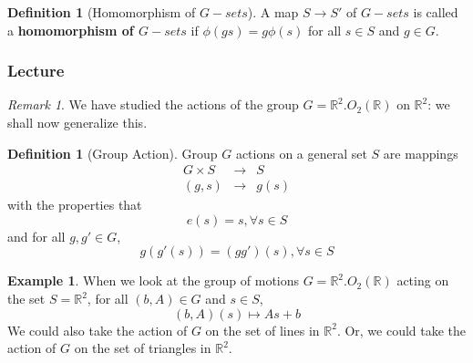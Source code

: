 \documentclass[12pt]{article}
\theoremstyle{definition}
\newtheorem{defn}[thm]{Definition}
\newtheorem{eg}[thm]{Example}
\theoremstyle{remark}
\newtheorem{rmk}[thm]{Remark}
\numberwithin{equation}{section}
\newcommand\R{\mathbb R}    %
\newcommand\B[1]{\textbf{ #1}}
\begin{document}
\vspace{15pt}



\begin{defn}[Homomorphism of $G-sets$]
        A map $S \rightarrow S'$ of $G-sets$ is called a \B{homomorphism of $G-sets$} if $\phi(gs) = g\phi(s)$ for all $s \in S$ and $g \in G$. 
\end{defn}

\vspace{15pt}





\subsubsection{Lecture}

\begin{rmk}
        We have studied the actions of the group $G = \R^2.O_2(\R)$ on $\R^2$: we shall now generalize this.
\end{rmk}

\vspace{15pt}

\begin{defn}[Group Action]
        Group $G$ actions on a general set $S$ are mappings \begin{equation}
                \begin{array}{ccc} G\times S& \rightarrow& S \\ (g,s) & \rightarrow & g(s) \end{array}
        \end{equation}
        with the properties that \begin{equation}
                e(s) = s, \forall s \in S
        \end{equation}
        and for all $g,g' \in G$, \begin{equation}
                g(g'(s)) = (gg')(s), \forall s \in S
        \end{equation}
\end{defn}

\vspace{15pt}
\begin{eg}
        When we look at the group of motions $G = \R^2.O_2(\R)$ acting on the set $S = \R^2$, for all $(b,A) \in G$ and $s \in S$, \begin{equation}
                (b,A)(s) \mapsto As + b
        \end{equation}
        We could also take the action of $G$ on the set of lines in $\R^2$. Or, we could take the action of $G$ on the set of triangles in $\R^2$.
\end{eg}
\end{document}
